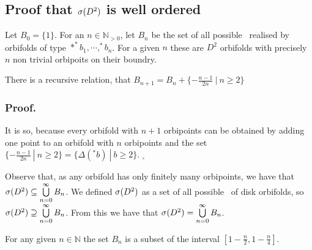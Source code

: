 \subsection{Proof that ${{\sigma}(D^2)}$ is well ordered}

\begin{definition} 
Let $B_0 = \{1\}$.
For an $n \in \mathbb{N}_{>0}$, let $B_n$ be the set of all possible \Eoc\ realised 
by orbifolds of type 
$*^*b_1, \cdots, ^*b_n$. For a given $n$ these are 
$D^2$ orbifolds with precisely $n$ non trivial orbipoits on their boundry.
\end{definition}


\begin{observation}\label{recursive_relation}
There is a recursive relation, that $B_{n+1}=B_n+\{-\frac{n-1}{2n}\ |\ n\geq 2\}$
\end{observation}
\subsubsection{Proof.}
It is so, because every orbifold with $n+1$ orbipoints can be obtained by adding one point 
to an orbifold with $n$ orbipoints and the set 
$\{-\frac{n-1}{2n}\ |\ n\geq 2\} = \{\Delta(^\ast b)\ |\ b \geq 2\}$. $_\square$


\begin{observation}\label{form_of_a_spectrum}
Observe that, as any orbifold has only finitely many orbipoints, we have that ${{\sigma}(D^2)} \subseteq 
\bigcup\limits^\infty_{n=0}B_n $. We defined ${{\sigma}(D^2)}$ as a set of all possible \Eoc\ of disk 
orbifolds, so ${{\sigma}(D^2)} \supseteq 
\bigcup\limits^\infty_{n=0}B_n $. From this we have that ${{\sigma}(D^2)} = \bigcup\limits^\infty_{n=0}B_n$.
\end{observation}

\begin{lemma}\label{fixed_number_of_orbipoints}
For any given $n \in \mathbb{N}$ the set $B_n$ is a subset of the interval 
$[1-\frac{n}{2}, 1-\frac{n}{4}]$.
\end{lemma}
